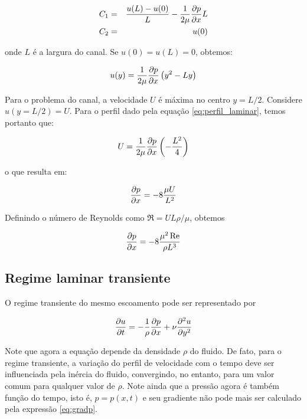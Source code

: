 \begin{eqnarray}
    C_1 &=& \frac{u(L)-u(0)}{L}-\frac{1}{2\mu}\frac{\partial p}{\partial x}L\\
    C_2 &=& u(0)
\end{eqnarray}

onde $L$ é a largura do canal. Se $u(0)=u(L)=0$, obtemos:

\begin{equation}
  u(y) = \frac{1}{2\mu}\frac{\partial p}{\partial x}\left(y^2-Ly\right)
  \label{eq:perfil_laminar}
\end{equation}

Para o problema do canal, a velocidade $U$ é máxima no centro $y=L/2$.
Considere $u(y=L/2)=U$. Para o perfil dado pela equação
\ref{eq:perfil_laminar}, temos portanto que:

\begin{equation}
  U = \frac{1}{2\mu}\frac{\partial p}{\partial x}\left(-\frac{L^2}{4}\right)
\end{equation}

o que resulta em:

\begin{equation}
  \frac{\partial p}{\partial x}=-8\frac{\mu U}{L^2}
  \label{eq:gradp}
\end{equation}

Definindo o número de Reynolds como $\Re=UL\rho/\mu$, obtemos

\begin{equation}
  \frac{\partial p}{\partial x}=-8\frac{\mu^2\operatorname{Re}}{\rho L^3}
  \label{eq:gradp-Re}
\end{equation}

\subsection{Regime laminar transiente}

O regime transiente do mesmo escoamento pode ser representado por

\begin{equation}
    \frac{\partial u}{\partial t}=-\frac{1}{\rho}\frac{\partial p}{\partial x}+\nu\frac{\partial^2u}{\partial y^2}
    \label{eq:perfil_laminar_transiente}
\end{equation}

Note que agora a equação depende da densidade $\rho$ do fluido. De fato,
para o regime transiente, a variação do perfil de velocidade com o tempo
deve ser influenciada pela inércia do fluido, convergindo, no entanto,
para um valor comum para qualquer valor de $\rho$. Note ainda que a
pressão agora é também função do tempo, isto é, $p = p(x,t)$ e seu
gradiente não pode mais ser calculado pela expressão \ref{eq:gradp}.

